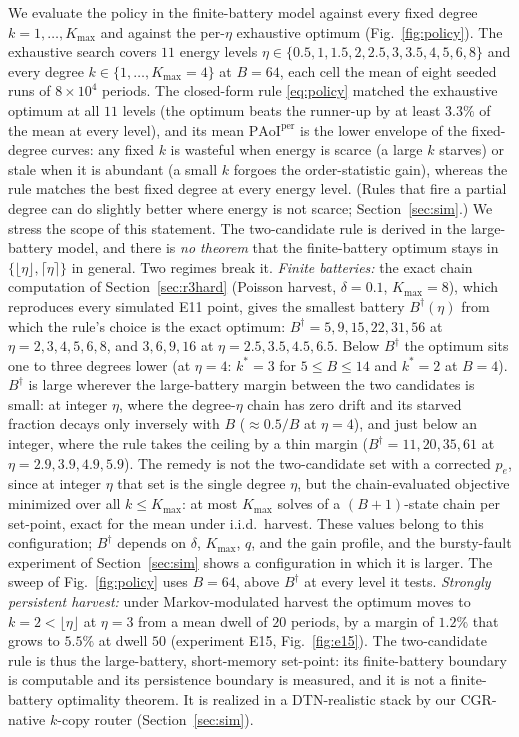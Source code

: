 \documentclass[twocolumn,3p,times,procedia]{elsarticle}
\theoremstyle{plain}
\theoremstyle{remark}
\newcommand{\PAoIper}{\mathrm{PAoI}^{\mathrm{per}}}
\newcommand{\peff}{p_e}
\begin{document}
We evaluate the policy in the finite-battery model against every fixed
degree $k=1,\dots,K_{\max}$ and against the per-$\eta$ exhaustive optimum
(Fig.~\ref{fig:policy}). The exhaustive search covers $11$ energy
levels $\eta\in\{0.5,1,1.5,2,2.5,3,3.5,4,5,6,8\}$ and every degree
$k\in\{1,\dots,K_{\max}{=}4\}$ at $B{=}64$, each cell the mean of eight
seeded runs of $8\times10^{4}$ periods. The closed-form rule
\eqref{eq:policy} matched the exhaustive optimum at all $11$ levels
(the optimum beats the runner-up by at least $3.3\%$ of the mean at
every level), and its mean $\PAoIper$ is the lower envelope of the
fixed-degree curves: any fixed $k$ is wasteful when energy is scarce (a
large $k$ starves) or stale when it is abundant (a small $k$ forgoes the
order-statistic gain), whereas the rule matches the best fixed degree
at every energy level. (Rules that fire a partial degree can do
slightly better where energy is not scarce; Section~\ref{sec:sim}.) We
stress the scope of this statement. The two-candidate rule is derived
in the large-battery model, and there is \emph{no theorem} that the
finite-battery optimum stays in $\{\lfloor\eta\rfloor,\lceil\eta\rceil\}$
in general. Two regimes break it. \emph{Finite batteries:} the exact
chain computation of Section~\ref{sec:r3hard} (Poisson harvest,
$\delta{=}0.1$, $K_{\max}{=}8$), which reproduces every simulated E11
point, gives the smallest battery $B^{\dagger}(\eta)$ from which the
rule's choice is the exact optimum: $B^{\dagger}=5,9,15,22,31,56$ at
$\eta=2,3,4,5,6,8$, and $3,6,9,16$ at $\eta=2.5,3.5,4.5,6.5$. Below
$B^{\dagger}$ the optimum sits one to three degrees lower (at
$\eta{=}4$: $k^{\ast}{=}3$ for $5\le B\le14$ and $k^{\ast}{=}2$ at
$B{=}4$). $B^{\dagger}$ is large wherever the large-battery margin
between the two candidates is small: at integer $\eta$, where the
degree-$\eta$ chain has zero drift and its starved fraction decays only
inversely with $B$ (${\approx}0.5/B$ at $\eta{=}4$), and just below an
integer, where the rule takes the ceiling by a thin margin
($B^{\dagger}=11,20,35,61$ at $\eta=2.9,3.9,4.9,5.9$). The remedy is not
the two-candidate set with a corrected $\peff$, since at integer $\eta$
that set is the single degree $\eta$, but the chain-evaluated objective
minimized over all $k\le K_{\max}$: at most $K_{\max}$ solves of a
$(B{+}1)$-state chain per set-point, exact for the mean under i.i.d.\
harvest. These values belong to this configuration; $B^{\dagger}$
depends on $\delta$, $K_{\max}$, $q$, and the gain profile, and the
bursty-fault experiment of Section~\ref{sec:sim} shows a configuration
in which it is larger. The sweep of Fig.~\ref{fig:policy} uses
$B{=}64$, above $B^{\dagger}$ at every level it tests. \emph{Strongly
persistent harvest:} under Markov-modulated harvest the optimum moves to
$k{=}2<\lfloor\eta\rfloor$ at $\eta{=}3$ from a mean dwell of $20$
periods, by a margin of $1.2\%$ that grows to $5.5\%$ at dwell $50$
(experiment E15, Fig.~\ref{fig:e15}). The two-candidate
rule is thus the large-battery, short-memory set-point: its
finite-battery boundary is computable and its persistence boundary is
measured, and it is not a finite-battery optimality
theorem. It is realized in a DTN-realistic stack by our CGR-native
$k$-copy router (Section~\ref{sec:sim}).
\end{document}
